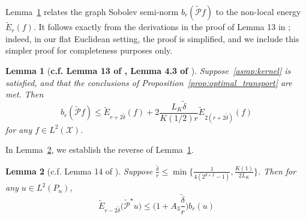 \documentclass[twoside]{article}
\newcommand{\1}{\mathbf{1}}
\newcommand{\Xset}{\mathcal{X}}
\newcommand{\Leb}{L}
\newcommand{\mc}[1]{\mathcal{#1}}
\newcommand{\wt}[1]{\widetilde{#1}}
\newtheorem{lemma}{Lemma}
\theoremstyle{definition}
\theoremstyle{remark}
\begin{document}
Lemma~\ref{lem:first_order_graph_sobolev_seminorm_discretized} relates the graph Sobolev semi-norm $b_r(\wt{\mc{P}}f)$ to the non-local energy $\wt{E}_r(f)$. It follows exactly from the derivations in the proof of Lemma 13 in \cite{trillos2019}; indeed, in our flat Euclidean setting, the proof is simplified, and we include this simpler proof for completeness purposes only.
\begin{lemma}[\textbf{c.f. Lemma 13 of \cite{trillos2019}, Lemma 4.3 of \cite{burago2014}}]
	\label{lem:first_order_graph_sobolev_seminorm_discretized}
	Suppose~\ref{asmp:kernel} is satisfied, and that the conclusions of Proposition~\ref{prop:optimal_transport} are met. Then
	\begin{equation*}
	b_r(\wt{\mc{P}}f) \leq \wt{E}_{r + 2\wt{\delta}}(f) + 2\frac{L_K\wt{\delta}}{K(1/2)r} \wt{E}_{2(r + 2\wt{\delta})}(f)
	\end{equation*}
	for any $f \in \Leb^2(\Xset)$.
\end{lemma}

In Lemma~\ref{lem:first_order_graph_sobolev_seminorm_discretized_lb}, we establish the reverse of Lemma~\ref{lem:first_order_graph_sobolev_seminorm_discretized}. 
\begin{lemma}[c.f. Lemma 14 of \cite{trillos2019}]
	\label{lem:first_order_graph_sobolev_seminorm_discretized_lb}
	Suppose $\frac{\wt{\delta}}{r} \leq \min\bigl\{\frac{1}{4(2^{d + 2} - 1)}, \frac{K(1)}{2L_K}\bigr\}$. Then for any $u \in \Leb^2(P_n)$, 
	\begin{equation*}
	\wt{E}_{r - 2\wt{\delta}}\bigl(\wt{\mc{P}}^{\star}u\bigr) \leq \biggl(1 + A_3\frac{\wt{\delta}}{r}\biggr) b_{r}(u)
	\end{equation*}
\end{lemma}
\end{document}
